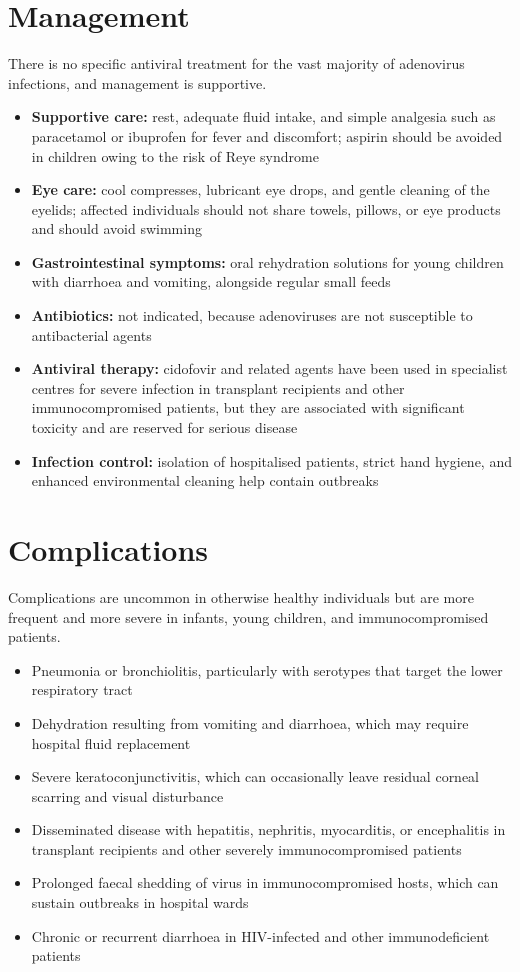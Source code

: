 \section*{Management}
There is no specific antiviral treatment for the vast majority of adenovirus infections, and management is supportive.

\begin{itemize}
    \item \textbf{Supportive care:} rest, adequate fluid intake, and simple analgesia such as paracetamol or ibuprofen for fever and discomfort; aspirin should be avoided in children owing to the risk of Reye syndrome
    \item \textbf{Eye care:} cool compresses, lubricant eye drops, and gentle cleaning of the eyelids; affected individuals should not share towels, pillows, or eye products and should avoid swimming
    \item \textbf{Gastrointestinal symptoms:} oral rehydration solutions for young children with diarrhoea and vomiting, alongside regular small feeds
    \item \textbf{Antibiotics:} not indicated, because adenoviruses are not susceptible to antibacterial agents
    \item \textbf{Antiviral therapy:} cidofovir and related agents have been used in specialist centres for severe infection in transplant recipients and other immunocompromised patients, but they are associated with significant toxicity and are reserved for serious disease
    \item \textbf{Infection control:} isolation of hospitalised patients, strict hand hygiene, and enhanced environmental cleaning help contain outbreaks
\end{itemize}

\section*{Complications}
Complications are uncommon in otherwise healthy individuals but are more frequent and more severe in infants, young children, and immunocompromised patients.

\begin{itemize}
    \item Pneumonia or bronchiolitis, particularly with serotypes that target the lower respiratory tract
    \item Dehydration resulting from vomiting and diarrhoea, which may require hospital fluid replacement
    \item Severe keratoconjunctivitis, which can occasionally leave residual corneal scarring and visual disturbance
    \item Disseminated disease with hepatitis, nephritis, myocarditis, or encephalitis in transplant recipients and other severely immunocompromised patients
    \item Prolonged faecal shedding of virus in immunocompromised hosts, which can sustain outbreaks in hospital wards
    \item Chronic or recurrent diarrhoea in HIV-infected and other immunodeficient patients
\end{itemize}

